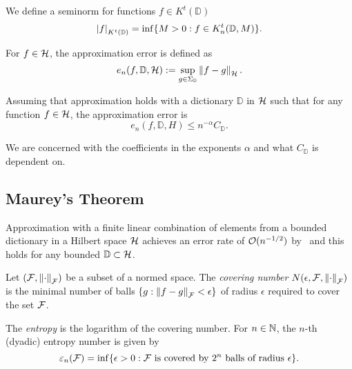 We define a seminorm for functions $f \in K^t(\mathbb{D})$
\begin{equation}
    \label{eq:general_seminorm}
    \left| f \right|_{K^t(\mathbb{D})} = \inf \{
        M >0: f \in K^t_n(\mathbb{D}, M)
    \}.
\end{equation}


For $f \in \mathcal{H}$, the approximation error is defined as
\begin{equation}
    \label{eq:appro_err_hilbert}
    e_n(f, \mathbb{D}, \mathcal{H})
        := \sup_{g\in\Sigma_{\mathbb{D}}} \left\| f - g \right\|_{\mathcal{H}}.
\end{equation}

Assuming that approximation holds with a dictionary $\mathbb{D}$ in $\mathcal{H}$
such that for any function $f \in \mathcal{H}$, the approximation error is
\begin{equation}
    \label{eq:appro_error_general}
    e_n(f, \mathbb{D}, H) \leq n^{-\alpha} C_{\mathbb{D}}.
\end{equation}

We are concerned with the coefficients in the exponents $\alpha$ and what
$C_{\mathbb{D}}$ is dependent on.

\subsection{Maurey's Theorem}
\label{subsec:maurey}

Approximation with a finite linear combination of elements from a bounded
dictionary in a Hilbert space $\mathcal{H}$ achieves an error rate of
$\mathcal{O}(n^{-1/2})$ by~\cite{pisierRemarquesResultatNon1980} and this holds for
any bounded $\mathbb{D} \subset \mathcal{H}$.

\begin{definition}
    \label{def:covering_num}
    Let $(\mathcal{F}, \left\| \cdot \right\|_{\mathcal{F}})$ be a subset of a normed space. The
    \textit{covering number} $N(\epsilon, \mathcal{F}, \left\| \cdot \right\|_{\mathcal{F}})$ is
    the minimal number of balls $\{g: \left\| f - g \right\|_{\mathcal{F}} < \epsilon\}$ of
    radius $\epsilon$ required to cover the set $\mathcal{F}$. 
\end{definition}

\begin{definition}
    \label{def:entropy} The \textit{entropy} is the logarithm of the covering
    number. For $n \in \mathbb{N}$, the $n$-th (dyadic) entropy number is given by
    \begin{equation}
        \varepsilon_{n}({\mathcal{F}})
        = \inf \{
            \epsilon > 0: \mathcal{F} \text{ is covered by } 2^n 
            \text{ balls of radius } \epsilon
        \}.
    \end{equation}
\end{definition}



